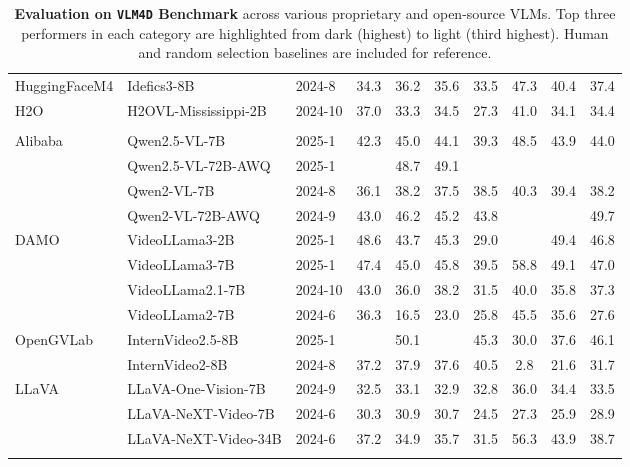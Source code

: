 \begin{table*}[h]
{\begin{tabular}{l l l c c c c c c c}
        \arrayrulecolor{lightgray} \hdashline
        HuggingFaceM4 & Idefics3-8B & 2024-8 & 34.3 & 36.2 & 35.6 & 33.5 & 47.3 & 40.4 & 37.4  \\
        \arrayrulecolor{lightgray} \hdashline
        H2O & H2OVL-Mississippi-2B & 2024-10 &  37.0 & 33.3 & 34.5 & 27.3 & 41.0 & 34.1 & 34.4  \\
        \arrayrulecolor{black} \midrule
        \rowcolor[HTML]{e1f0f5} \multicolumn{10}{l}{\textbf{Open-source Video VLMs}} \\
        \midrule
        Alibaba & Qwen2.5-VL-7B & 2025-1 & 42.3 & 45.0 & 44.1 & 39.3 & 48.5 & 43.9 & 44.0   \\
        & Qwen2.5-VL-72B-AWQ & 2025-1 & \cellcolor[HTML]{FFE5CC}{49.9} & 48.7 & 49.1 & \cellcolor[HTML]{FFB366}{\textbf{54.3}} & \cellcolor[HTML]{FFB366}{\textbf{72.8}} & \cellcolor[HTML]{FFB366}{\textbf{63.5}} & \cellcolor[HTML]{FFB366}{\textbf{54.4}}  \\
        & Qwen2-VL-7B & 2024-8 & 36.1 & 38.2 & 37.5 & 38.5 & 40.3 & 39.4 & 38.2 \\
        & Qwen2-VL-72B-AWQ & 2024-9 & 43.0 & 46.2 & 45.2 & 43.8 & \cellcolor[HTML]{FFCC99}{71.0} & \cellcolor[HTML]{FFCC99}{57.4} & 49.7 \\
        \hdashline
        DAMO & VideoLLama3-2B & 2025-1 & 48.6 & 43.7 & 45.3 & 29.0 & \cellcolor[HTML]{FFE5CC}{69.8} & 49.4 & 46.8 \\
        & VideoLLama3-7B & 2025-1 & 47.4 & 45.0 & 45.8 & 39.5 & 58.8 & 49.1 & 47.0 \\
        & VideoLLama2.1-7B & 2024-10 & 43.0 & 36.0 & 38.2 & 31.5 & 40.0 & 35.8 & 37.3 \\
        & VideoLLama2-7B & 2024-6 & 36.3 & 16.5 & 23.0 & 25.8 & 45.5 & 35.6 & 27.6 \\
        \hdashline
        OpenGVLab & InternVideo2.5-8B & 2025-1 &  \cellcolor[HTML]{FFCC99}{52.8} & 50.1 & \cellcolor[HTML]{FFCC99}{51.0} & 45.3 & 30.0 & 37.6  & 46.1 \\
        & InternVideo2-8B & 2024-8 & 37.2 & 37.9 & 37.6 & 40.5 & 2.8 & 21.6 & 31.7\\
        \hdashline
        LLaVA & LLaVA-One-Vision-7B & 2024-9 & 32.5 & 33.1 & 32.9 & 32.8 & 36.0 & 34.4 & 33.5  \\
        & LLaVA-NeXT-Video-7B & 2024-6 & 30.3 & 30.9 & 30.7 & 24.5 & 27.3 & 25.9 & 28.9  \\
        & LLaVA-NeXT-Video-34B & 2024-6 & 37.2 & 34.9 & 35.7 & 31.5 & 56.3 & 43.9 & 38.7  \\
        \arrayrulecolor{black} \bottomrule
    \end{tabular}
    }
    \caption{\textbf{Evaluation on \texttt{VLM4D} Benchmark} across various proprietary and open-source VLMs. Top three performers in each category are highlighted from \colorbox[HTML]{FFB366}{dark} (highest) to \colorbox[HTML]{FFE5CC}{light} (third highest). Human and random selection baselines are included for reference.}
\label{tab:result}
\end{table*}  

